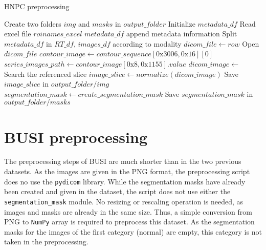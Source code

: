 \begin{algorithm}[t!]
  \caption{HNPC preprocessing}
  \label{algo:hnpcpreproc}
  \begin{algorithmic}[1]
    \State Create two folders $img$ and $masks$ in $output\_folder$
    \State Initialize $metadata\_df$
    \State Read excel file $roinames\_excel$ 
            \State $metadata\_df$ append metadata information
          \EndIf
        \EndFor
      \EndFor
    \EndFor
    \State Split $metadata\_df$ in $RT\_df$, $images\_df$ \Comment according to modality
      \State $dicom\_file \gets row$
      \State Open $dicom\_file$ 
        \State $contour\_image \gets contour\_sequence[0\text{x}3006,0\text{x}16][0]$ 
        \State $series\_images\_path \gets contour\_image[0\text{x}8,0\text{x}1155].value$ 
          \State $dicom\_image \gets$ Search the referenced slice
          \State $image\_slice \gets normalize(dicom\_image)$ 
          \State Save $image\_slice$ in $output\_folder/img$
          \State $segmentation\_mask \gets create\_segmentation\_mask$
          \State Save $segmentation\_mask$ in $output\_folder/masks$
        \EndFor
      \EndFor
    \EndFor
  \end{algorithmic}
\end{algorithm}

\newpage
\section{BUSI preprocessing}
The preprocessing steps of BUSI are much shorter than in the two previous datasets. As the images are given in the PNG format, the preprocessing script does no use the \texttt{pydicom} library. While the segmentation masks have already been created and given in the dataset, the script does not use either the \texttt{segmentation\_mask} module. No resizing or rescaling operation is needed, as images and masks are already in the same size. Thus, a simple conversion from PNG to \texttt{NumPy} array is required to preprocess this dataset. As the segmentation masks for the images of the first category (normal) are empty, this category is not taken in the preprocessing.

